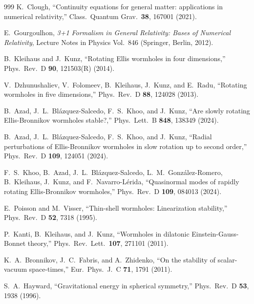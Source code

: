 \documentclass[twocolumn,floatfix,aps,prd,superscriptaddress,nofootinbib]{revtex4-2}
\begin{document}
\begin{thebibliography}{999}
K.~Clough,
\newblock ``Continuity equations for general matter: applications in numerical relativity,''
\newblock Class.\ Quantum Grav.\ \textbf{38}, 167001 (2021).

E.~Gourgoulhon,
\newblock \emph{3+1 Formalism in General Relativity: Bases of Numerical Relativity}, Lecture Notes in Physics Vol.~846
\newblock (Springer, Berlin, 2012).

B.~Kleihaus and J.~Kunz,
\newblock ``Rotating Ellis wormholes in four dimensions,''
\newblock Phys.\ Rev.\ D \textbf{90}, 121503(R) (2014).

V.~Dzhunushaliev, V.~Folomeev, B.~Kleihaus, J.~Kunz, and E.~Radu,
\newblock ``Rotating wormholes in five dimensions,''
\newblock Phys.\ Rev.\ D \textbf{88}, 124028 (2013).

B.~Azad, J.~L.~Bl\'azquez-Salcedo, F.~S.~Khoo, and J.~Kunz,
\newblock ``Are slowly rotating Ellis-Bronnikov wormholes stable?,''
\newblock Phys.\ Lett.\ B \textbf{848}, 138349 (2024).

B.~Azad, J.~L.~Bl\'azquez-Salcedo, F.~S.~Khoo, and J.~Kunz,
\newblock ``Radial perturbations of Ellis-Bronnikov wormholes in slow rotation up to second order,''
\newblock Phys.\ Rev.\ D \textbf{109}, 124051 (2024).

F.~S.~Khoo, B.~Azad, J.~L.~Bl\'azquez-Salcedo, L.~M.~Gonz\'alez-Romero, B.~Kleihaus, J.~Kunz, and F.~Navarro-L\'erida,
\newblock ``Quasinormal modes of rapidly rotating Ellis-Bronnikov wormholes,''
\newblock Phys.\ Rev.\ D \textbf{109}, 084013 (2024).

E.~Poisson and M.~Visser,
\newblock ``Thin-shell wormholes: Linearization stability,''
\newblock Phys.\ Rev.\ D \textbf{52}, 7318 (1995).

P.~Kanti, B.~Kleihaus, and J.~Kunz,
\newblock ``Wormholes in dilatonic Einstein-Gauss-Bonnet theory,''
\newblock Phys.\ Rev.\ Lett.\ \textbf{107}, 271101 (2011).

K.~A.~Bronnikov, J.~C.~Fabris, and A.~Zhidenko,
\newblock ``On the stability of scalar-vacuum space-times,''
\newblock Eur.\ Phys.\ J.\ C \textbf{71}, 1791 (2011).


S.~A.~Hayward,
\newblock ``Gravitational energy in spherical symmetry,''
\newblock Phys.\ Rev.\ D \textbf{53}, 1938 (1996).


\end{thebibliography}
\end{document}
